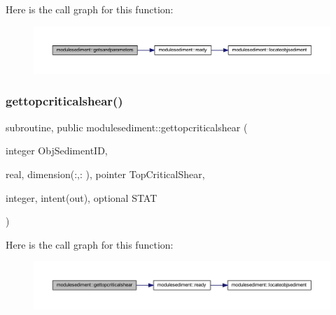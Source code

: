 Here is the call graph for this function\+:\nopagebreak
\begin{figure}[H]
\begin{center}
\leavevmode
\includegraphics[width=350pt]{namespacemodulesediment_a283894d1d09fefa91f63082646eea486_cgraph}
\end{center}
\end{figure}
\mbox{\label{namespacemodulesediment_ac51110b9c285467a4e284c185a4a98b1}} 
\subsubsection{\texorpdfstring{gettopcriticalshear()}{gettopcriticalshear()}}
{\footnotesize\ttfamily subroutine, public modulesediment\+::gettopcriticalshear (\begin{DoxyParamCaption}\item[{integer}]{Obj\+Sediment\+ID,  }\item[{real, dimension(\+:,\+:  ), pointer}]{Top\+Critical\+Shear,  }\item[{integer, intent(out), optional}]{S\+T\+AT }\end{DoxyParamCaption})}

Here is the call graph for this function\+:\nopagebreak
\begin{figure}[H]
\begin{center}
\leavevmode
\includegraphics[width=350pt]{namespacemodulesediment_ac51110b9c285467a4e284c185a4a98b1_cgraph}
\end{center}
\end{figure}
\mbox{\label{namespacemodulesediment_a3799836daf0cb05055644810de5e7fd0}} 
